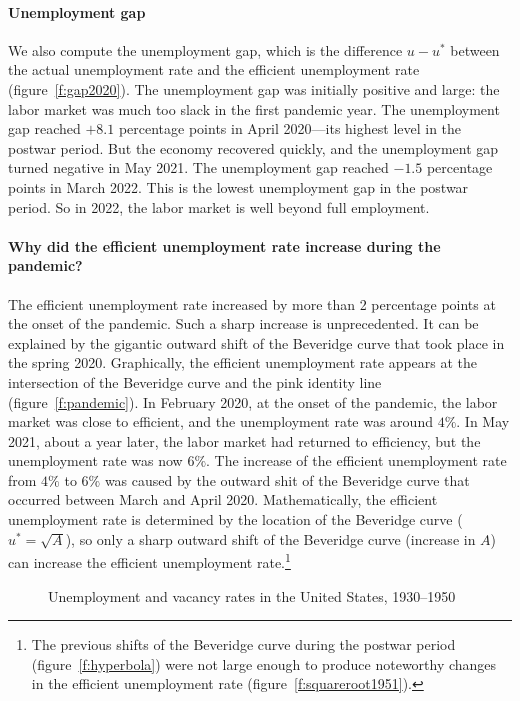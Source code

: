 \documentclass[letterpaper,12pt,leqno]{article}
\newcommand{\pdf}{figures.pdf}
\begin{document}
\paragraph{Unemployment gap} We also compute the unemployment gap, which is the difference $u-u^*$ between the actual unemployment rate and the efficient unemployment rate (figure~\ref{f:gap2020}). The unemployment gap was initially positive and large: the labor market was much too slack in the first pandemic year. The unemployment gap reached $+8.1$ percentage points in April 2020---its highest level in the postwar period. But the economy recovered quickly, and the unemployment gap turned negative in May 2021. The unemployment gap reached $-1.5$ percentage points in March 2022. This is the lowest unemployment gap in the postwar period. So in 2022, the labor market is well beyond full employment.

\paragraph{Why did the efficient unemployment rate increase during the pandemic?} The efficient unemployment rate increased by more than 2 percentage points at the onset of the pandemic. Such a sharp increase is unprecedented. It can be explained by the gigantic outward shift of the Beveridge curve that took place in the spring 2020. Graphically, the efficient unemployment rate appears at the intersection of the Beveridge curve and the pink identity line (figure~\ref{f:pandemic}). In February 2020, at the onset of the pandemic, the labor market was close to efficient, and the unemployment rate was around $4\%$. In May 2021, about a year later, the labor market had returned to efficiency, but the unemployment rate was now $6\%$. The increase of the efficient unemployment rate from $4\%$ to $6\%$ was caused by the outward shit of the Beveridge curve that occurred between March and April 2020. Mathematically, the efficient unemployment rate is determined by the location of the Beveridge curve ($u^* = \sqrt{A}$), so only a sharp outward shift of the Beveridge curve (increase in $A$) can increase the efficient unemployment rate.\footnote{The previous shifts of the Beveridge curve during the postwar period (figure~\ref{f:hyperbola}) were not large enough to produce noteworthy changes in the efficient unemployment rate (figure~\ref{f:squareroot1951}).}

\begin{figure}[t]
\hfill
{}
\caption{Unemployment and vacancy rates in the United States, 1930--1950}
\label{f:1930}\end{figure}
\end{document}
